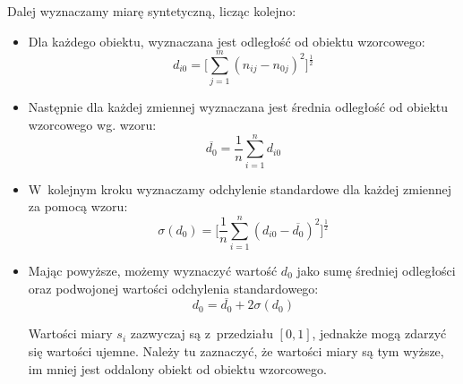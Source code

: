 \documentclass[12pt,a4paper]{report}
\begin{document}
Dalej wyznaczamy miarę syntetyczną, licząc kolejno:
\begin{itemize}
\item Dla każdego obiektu, wyznaczana jest odległość od obiektu wzorcowego:
$$d_{i0}=\bigg[\sum_{j=1}^{m} (n_{ij} - n_{0j})^2 \bigg]^\frac{1}{2}  $$ 
\item Następnie dla każdej zmiennej wyznaczana jest średnia odległość od obiektu wzorcowego wg. wzoru:
$$\overline{d_{0}}=\frac{1}{n}\sum_{i=1}^{n} d_{i0} $$
\item W~kolejnym kroku wyznaczamy odchylenie standardowe dla każdej zmiennej za pomocą wzoru: 
$$\sigma(d_{0})=\bigg[\frac{1}{n}\sum_{i=1}^{n} (d_{i0}-\overline{d_{0}})^2 \bigg]^\frac{1}{2} $$
\item Mając powyższe, możemy wyznaczyć wartość $d_{0}$ jako sumę średniej odległości oraz podwojonej wartości odchylenia standardowego:
$$d_{0}=\overline{d_{0}} + 2\sigma(d_{0}) $$


Wartości miary $s_{i}$ zazwyczaj są z~przedziału $[0, 1]$, jednakże mogą zdarzyć się wartości ujemne. Należy tu zaznaczyć, że wartości miary są tym wyższe, im mniej jest oddalony obiekt od obiektu wzorcowego. 

\end{itemize}
%
%
\end{document}

